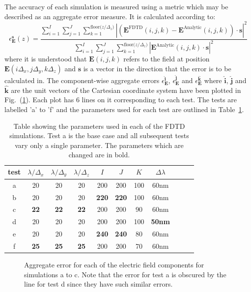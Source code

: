 \documentclass[a4paper, 12pt]{article}
\newcommand{\rfig}[1]{Fig.\ (\ref{#1})}
\newcommand{\tab}[1]{Table\ \ref{#1}}
\begin{document}
	The accuracy of each simulation is measured using a metric which may
	be described as an aggregate error measure. It is calculated according
	to:
	\begin{equation}
		\epsilon_{\mathbf{E}}^{\mathbf{s}}(z)=\frac{\sum\limits_{i=1}^{I}\sum\limits_{j=1}^{J}\sum\limits_{k=1}^{\textrm{floor(}z/\Delta_z\textrm{)}}\left|\left(\mathbf{E}^{\textrm{FDTD}}(i,j,k)-\mathbf{E}^{\textrm{Analytic}}(i,j,k)\right)\!\cdot\!\mathbf{s}\right|^2}{\sum\limits_{i=1}^{I}\sum\limits_{j=1}^{J}\sum\limits_{k=1}^{\textrm{floor(}z/\Delta_z\textrm{)}}\left|\mathbf{E}^{\textrm{Analytic}}(i,j,k)\!\cdot\!\mathbf{s}\right|^2}
		\label{eq:fdtd:aggerr}
	\end{equation}
	where it is understood that $\mathbf{E}(i,j,k)$ refers to the field at
	position $\mathbf{E}(i\Delta_x,j\Delta_y,k\Delta_z)$ and $\mathbf{s}$
	is a vector in the direction that the error is to be calculated
	in. The component-wise aggregate errors
	$\epsilon_{\mathbf{E}}^{\hat{\mathbf{i}}}$,
	$\epsilon_{\mathbf{E}}^{\hat{\mathbf{j}}}$ and
	$\epsilon_{\mathbf{E}}^{\hat{\mathbf{k}}}$ where $\hat{\mathbf{i}}$,
	$\hat{\mathbf{j}}$ and $\hat{\mathbf{k}}$ are the unit vectors of the
	Cartesian coordinate system have been plotted in
	\rfig{fig:fdtd:fdtd_rw}. Each plot has 6 lines on it corresponding to
	each test. The tests are labelled 'a' to 'f' and the parameters used
	for each test are outlined in \tab{tab:fdtd:sims}.
	\begin{table}[!h]
		\begin{center}
			\begin{tabular}{|c|c|c|c|c|c|c|c|c|c|c|}
				\hline
				test&$\lambda/\Delta_x$&$\lambda/\Delta_y$&$\lambda/\Delta_z$&$I$&$J$&$K$&$\Delta \lambda$\\
				\hline
				a&20&20&20&200&200&100&60nm\\
				\hline
				b&20&20&20&\bf{220}&\bf{220}&100&60nm\\
				\hline
				c&\bf{22}&\bf{22}&\bf{22}&200&200&90&60nm\\
				\hline
				d&20&20&20&200&200&100&\bf{50nm}\\
				\hline
				e&20&20&20&\bf{240}&\bf{240}&80&60nm\\
				\hline
				f&\bf{25}&\bf{25}&\bf{25}&200&200&70&60nm\\
				\hline
			\end{tabular}
		\end{center}
		\caption{Table showing the parameters used in each of the FDTD
			simulations. Test a is the base case and all subsequent tests vary
			only a single parameter. The parameters which are changed are
			in bold.}
		\label{tab:fdtd:sims}
	\end{table}
	\begin{figure}[!h]
		\centering
		\caption{Aggregate error for each of the electric field components
			for simulations a to c. Note that the error for test a is obscured
			by the line for test d since they have such similar errors.}
		\label{fig:fdtd:fdtd_rw}
	\end{figure}
\end{document}
